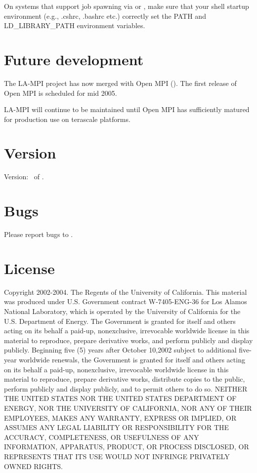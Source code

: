 \documentclass[english]{article}
\begin{document}
On systems that support job spawning via  or ,
make sure that your shell startup environment (e.g., .cshrc, .bashrc
etc.) correctly set the PATH and LD\_LIBRARY\_PATH environment
variables.

\section{Future development}
The LA-MPI project has now merged with Open MPI
().  The first release of Open MPI is
scheduled for mid 2005.

LA-MPI will continue to be maintained until Open MPI has sufficiently
matured for production use on terascale platforms.

\section{Version}
Version: \Version\ of \Date.

\section{Bugs}
Please report bugs to .

\section{License}

Copyright 2002-2004.  The Regents of the University of
California. This material was produced under U.S. Government contract
W-7405-ENG-36 for Los Alamos National Laboratory, which is operated by
the University of California for the U.S. Department of Energy. The
Government is granted for itself and others acting on its behalf a
paid-up, nonexclusive, irrevocable worldwide license in this material
to reproduce, prepare derivative works, and perform publicly and
display publicly. Beginning five (5) years after October 10,2002
subject to additional five-year worldwide renewals, the Government is
granted for itself and others acting on its behalf a paid-up,
nonexclusive, irrevocable worldwide license in this material to
reproduce, prepare derivative works, distribute copies to the public,
perform publicly and display publicly, and to permit others to do
so. NEITHER THE UNITED STATES NOR THE UNITED STATES DEPARTMENT OF
ENERGY, NOR THE UNIVERSITY OF CALIFORNIA, NOR ANY OF THEIR EMPLOYEES,
MAKES ANY WARRANTY, EXPRESS OR IMPLIED, OR ASSUMES ANY LEGAL LIABILITY
OR RESPONSIBILITY FOR THE ACCURACY, COMPLETENESS, OR USEFULNESS OF ANY
INFORMATION, APPARATUS, PRODUCT, OR PROCESS DISCLOSED, OR REPRESENTS
THAT ITS USE WOULD NOT INFRINGE PRIVATELY OWNED RIGHTS.
\end{document}
